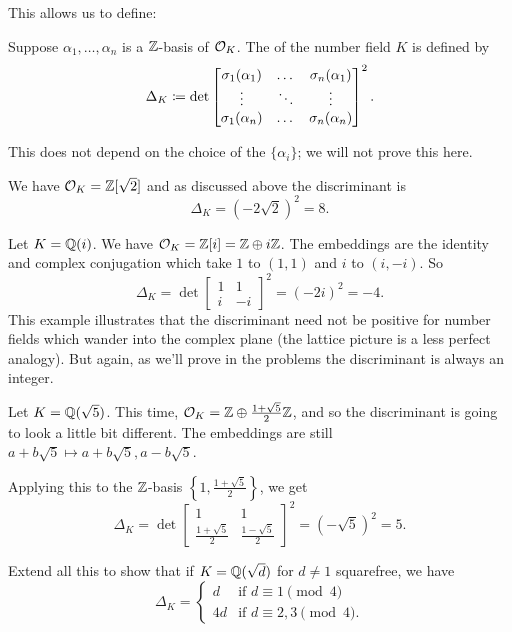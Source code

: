 This allows us to define:
\begin{definition}
	Suppose $\alpha_1, \dots, \alpha_n$ is a $\mathbb Z$-basis of $\mathcal O_K$.
	The  of the number field $K$ is defined by
	\[
	\Delta_K \coloneqq \det 
	\begin{bmatrix}
		\sigma_1(\alpha_1) & \dots & \sigma_n(\alpha_1) \\
		\vdots & \ddots & \vdots \\
		\sigma_1(\alpha_n) & \dots & \sigma_n(\alpha_n) \\
	\end{bmatrix}^2.
	\]
\end{definition}
This does not depend on the choice of the $\{\alpha_i\}$;
we will not prove this here.
\begin{example}[Discriminant of $K = \QQ(\sqrt2)$]
	We have $\mathcal O_K = \mathbb Z[\sqrt 2]$
	and as discussed above the discriminant is
	\[
		\Delta_K = 
		(-2 \sqrt 2)^2 = 8.
	\]
\end{example}
\begin{example}[Discriminant of $\QQ(i)$]
	Let $K = \mathbb Q(i)$.
	We have $\mathcal O_K = \mathbb Z[i] = \mathbb Z \oplus i \mathbb Z$.
	The embeddings are the identity and complex conjugation
	which take $1$ to $(1,1)$ and $i$ to $(i, -i)$.
	So
	\[
		\Delta_K = 
		\det 
		\begin{bmatrix}
			1 & 1 \\
			i & -i
		\end{bmatrix}^2
		=
		(-2i)^2 = -4.
	\]
	This example illustrates that the discriminant need not be positive
	for number fields which wander into the complex plane
	(the lattice picture is a less perfect analogy).
	But again, as we'll prove in the problems the discriminant is always
	an integer.
\end{example}
\begin{example}
	Let $K = \mathbb Q(\sqrt5)$.
	This time, $\mathcal O_K = \mathbb Z \oplus \frac{1+\sqrt5}{2} \mathbb Z$, and so the discriminant
	is going to look a little bit different.
	The embeddings are still $a+b\sqrt 5 \mapsto a+b\sqrt5, a-b\sqrt5$.

	Applying this to the $\mathbb Z$-basis $\left\{ 1, \frac{1+\sqrt5}{2} \right\}$, we get
	\[
		\Delta_K
		=
		\det
		\begin{bmatrix}
			1 & 1 \\
			\frac{1+\sqrt5}{2} & \frac{1-\sqrt5}{2}
		\end{bmatrix}^2
		= (-\sqrt 5)^2 = 5.
	\]
\end{example}
\begin{exercise}
	Extend all this to show that
	if $K = \mathbb Q(\sqrt d)$ for $d \neq 1$ squarefree, we have
	\[
		\Delta_K =
		\begin{cases}
			d & \text{if } d \equiv 1 \pmod 4 \\
			4d & \text{if } d \equiv 2, 3 \pmod 4.
		\end{cases}
	\]
\end{exercise}

